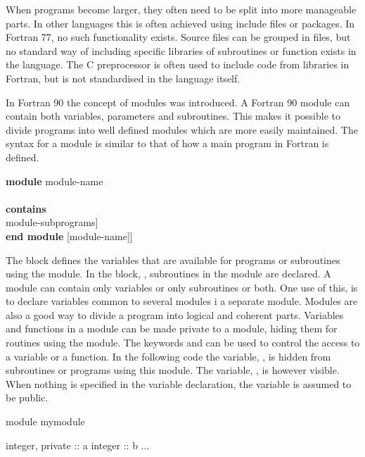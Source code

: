 When programs become larger, they often need to be split into more manageable parts. In other languages this is often achieved using include files or packages. In Fortran 77, no such functionality exists. Source files can be grouped in files, but no standard way of including specific libraries of subroutines or function exists in the language. The C preprocessor is often used to include code from libraries in Fortran, but is not standardised in the language itself.

In Fortran 90 the concept of modules was introduced. A Fortran 90 module can contain both variables, parameters and subroutines. This makes it possible to divide programs into well defined modules which are more easily maintained. The syntax for a module is similar to that of how a main program in Fortran is defined.

\begin{fsyntax}
\textbf{module} module-name \\
 \\
\protect{[}\textbf{contains} \\
\ftab module-subprograms] \\
\textbf{end module} [module-name]]
\end{fsyntax}

The block  defines the variables that are available for programs or subroutines using the module. In the block, , subroutines in the module are declared. A module can contain only variables or only subroutines or both. One use of this, is to declare variables common to several modules i a separate module. Modules are also a good way to divide a program into logical and coherent parts. Variables and functions in a module can be made private to a module, hiding them for routines using the module. The keywords  and  can be used to control the access to a variable or a function. In the following code the variable, , is hidden from subroutines or programs using this module. The variable, , is however visible. When nothing is specified in the variable declaration, the variable is assumed to be public.

\begin{fortrancodeenv}
module mymodule

    integer, private :: a
    integer :: b
    ...

\end{fortrancodeenv}

